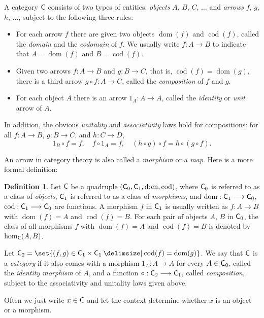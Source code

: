 \documentclass[12pt]{amsart}
\theoremstyle{plain}
\theoremstyle{definition}
\newtheorem{defn}[thm]{Definition}
\theoremstyle{remark}
\numberwithin{equation}{section}
\theoremstyle{plain}
\DeclareMathOperator{\dom}{dom}
\DeclareMathOperator{\cod}{cod}
\newcommand{\0}{\emptyset}
\providecommand\given{}
\newcommand\SetSymbol[1][]{%
\nonscript \: #1 \vert
\allowbreak
\nonscript\:
\mathopen{}}
\renewcommand\given{\SetSymbol[\delimsize]}
\newcommand{\fun}{\longrightarrow}
\newcommand{\cat}[1]{\textup{\textsf{#1}}}
\newcommand{\memph}[1]{{\color{magenta}\emph{#1}}}
\begin{document}
A category $\cat C$ consists of two types of entities: \memph{objects} $A$, $B$, $C$, $\ldots$ and \memph{arrows} $f$, $g$, $h$, $\ldots$, subject to the following three rules:
\begin{itemize}
 \item For each arrow $f$ there are given two objects $\dom(f)$ and $\cod(f)$, called the \memph{domain} and the \memph{codomain} of $f$. We usually write $f :A \fun B$ to indicate that $A = \dom(f)$ and  $B = \cod(f)$.
 \item Given two arrows $f : A \fun B$ and $g: B \fun C$, that is, $\cod(f) = \dom(g)$, there is a third arrow $g \circ f : A \fun C$, called the \memph{composition} of $f$ and $g$.
 \item  For each object $A$ there is an arrow $1_A : A \fun A$, called the \memph{identity} or \memph{unit} arrow of $A$.
\end{itemize}
In addition, the obvious \memph{unitality} and \memph{associativity} laws hold for compositions: for all $f : A \fun B$, $g : B \fun C$, and $h : C \fun D$,
\[
1_B \circ f = f, \quad f \circ 1_A = f, \quad (h \circ g) \circ f = h \circ (g \circ f).
\]

An arrow in category theory is also called a \memph{morphism} or a \memph{map}. Here is a more formal definition:

\begin{defn}\label{cat:def:2}
Let $\cat C$ be a quadruple $(\cat C_0, \cat C_1, \dom, \cod)$, where $\cat C_0$ is referred to as a class of \memph{objects},  $\cat C_1$ is referred to as a class of \memph{morphisms}, and $\dom : \cat C_1 \fun \cat C_0$, $\cod : \cat C_1 \fun \cat C_0$ are functions. A morphism $f$ in $\cat C_1$ is usually written as $f : A \fun B$ with $\dom(f) = A$ and $\cod(f) = B$. For each pair of objects $A$, $B$ in $\cat C_0$, the class of all morphisms $f$ with  $\dom(f) = A$ and $\cod(f) = B$ is denoted by $\hom_{\cat C}(A,B)$.

Let $\cat C_2 = \set{(f, g) \in \cat C_1 \times \cat C_1 \given \cod(f) = \dom (g)}$. We say that $\cat C$ is a \memph{category} if it also comes with a morphism $1_A : A \fun A$ for every $A \in \cat C_0$, called the \memph{identity morphism} of $A$, and a function $\circ : \cat C_2 \fun \cat C_1$, called \memph{composition}, subject to the associativity and unitality laws given above.
\end{defn}

Often we just write $x \in \cat C$ and let the context determine whether $x$ is an object or a morphism.
\end{document}
